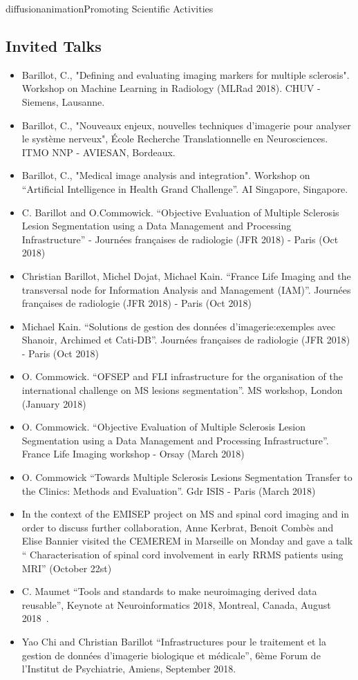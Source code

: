 \documentclass{ra2018}
\begin{document}
\begin{module}{diffusion}{animation}{Promoting Scientific Activities}
\subsection{Invited Talks}
\begin{itemize}
    \item Barillot, C., "Defining and evaluating imaging markers for multiple sclerosis". Workshop on Machine Learning in Radiology (MLRad 2018). CHUV - Siemens, Lausanne.
    \item Barillot, C., "Nouveaux enjeux, nouvelles techniques d'imagerie pour analyser le système nerveux", École Recherche Translationnelle en Neurosciences. ITMO NNP - AVIESAN, Bordeaux.
    \item Barillot, C., "Medical image analysis and integration". Workshop on “Artificial Intelligence in Health Grand Challenge”. AI Singapore, Singapore.      
    \item C. Barillot and O.Commowick. ``Objective Evaluation of Multiple Sclerosis Lesion Segmentation using a Data Management and Processing Infrastructure'' - Journées françaises de radiologie (JFR 2018) - Paris (Oct 2018)~\cite{commowick:inserm-01895603}
    \item Christian Barillot, Michel Dojat, Michael Kain. ``France Life Imaging and the transversal node for Information Analysis and Management (IAM)''. Journées françaises de radiologie (JFR 2018) - Paris (Oct 2018)~\cite{barillot:inserm-01895605}
    \item Michael Kain. ``Solutions de gestion des données d’imagerie:exemples avec Shanoir, Archimed et Cati-DB''. Journées françaises de radiologie (JFR 2018) - Paris (Oct 2018)~\cite{kain:inserm-01895596}
    \item O. Commowick. ``OFSEP and FLI infrastructure for the organisation of the international challenge on MS lesions segmentation''. MS workshop, London (January 2018)
    \item O. Commowick. ``Objective Evaluation of Multiple Sclerosis Lesion Segmentation using a Data Management and Processing Infrastructure''. France Life Imaging workshop - Orsay (March 2018)
    \item O. Commowick ``Towards Multiple Sclerosis Lesions Segmentation Transfer to the Clinics: Methods and Evaluation''. Gdr ISIS - Paris (March 2018)
    \item In the context of the EMISEP project on MS and spinal cord imaging and in order to discuss further collaboration, Anne Kerbrat, Benoit Combès and Elise Bannier visited the CEMEREM in Marseille on Monday and gave a talk `` Characterisation of spinal cord involvement in early RRMS patients using MRI'' (October 22st)
    \item C. Maumet ``Tools and standards to make neuroimaging derived data reusable'', Keynote at Neuroinformatics 2018, Montreal, Canada, August 2018~\cite{maumet:inserm-01886089}.
    \item Yao Chi and Christian Barillot ``Infrastructures pour le traitement et la gestion de données d'imagerie biologique et médicale'', 6ème Forum de l'Institut de Psychiatrie, Amiens, September 2018.
\end{itemize}



\end{module}
\end{document}
